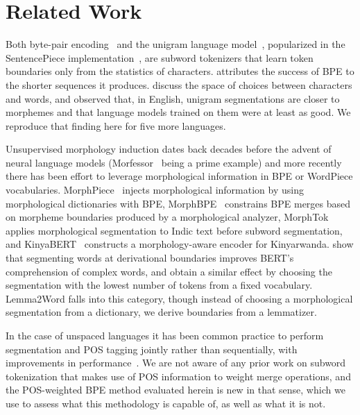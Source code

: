 \section{Related Work}\label{sec:related}

Both byte-pair encoding~\cite{sennrich2016bpe} and the unigram language model~\cite{kudo2018subword}, popularized in the SentencePiece implementation~\cite{kudo2018sentencepiece}, are subword tokenizers that learn token boundaries only from the statistics of characters.
\citet{galle2019bpe} attributes the success of BPE to the shorter sequences it produces.
\citet{mielke2021between} discuss the space of choices between characters and words, and \citet{bostrom2020bpe} observed that, in English, unigram segmentations are closer to morphemes and that language models trained on them were at least as good.
We reproduce that finding here for five more languages.

Unsupervised morphology induction dates back decades before the advent of neural language models (Morfessor~\cite{creutz2007morfessor} being a prime example) and more recently there has been effort to leverage morphological information in BPE or WordPiece vocabularies.
MorphPiece~\cite{jabbar2023morphpiece} injects morphological information by using morphological dictionaries with BPE, MorphBPE~\cite{asgari2025morphbpe} constrains BPE merges based on morpheme boundaries produced by a morphological analyzer, MorphTok~\cite{brahma2025morphtok} applies morphological segmentation to Indic text before subword segmentation, and KinyaBERT~\cite{nzeyimana2022kinyabert} constructs a morphology-aware encoder for Kinyarwanda.
\citet{hofmann2021superbizarre} show that segmenting words at derivational boundaries improves BERT's comprehension of complex words, and \citet{hofmann2022flota} obtain a similar effect by choosing the segmentation with the lowest number of tokens from a fixed vocabulary.
Lemma2Word falls into this category, though instead of choosing a morphological segmentation from a dictionary, we derive boundaries from a lemmatizer.

In the case of unspaced languages it has been common practice to perform segmentation and POS tagging jointly rather than sequentially, with improvements in performance~\cite{zhang2008joint}.
We are not aware of any prior work on subword tokenization that makes use of POS information to weight merge operations, and the POS-weighted BPE method evaluated herein is new in that sense, which we use to assess what this methodology is capable of, as well as what it is not.

